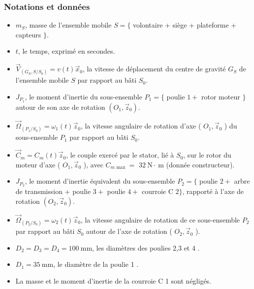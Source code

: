 \subsubsection*{Notations et données}
\begin{itemize}
  \item $m_{S}$, masse de l'ensemble mobile $S=\{$ volontaire + siège + plateforme + capteurs $\}$.
  \item $t$, le temps, exprimé en secondes.
  \item $\vec{V}_{\left(G_{S}, S / S_{0}\right)}=v(t) \vec{x}_{0}$, la vitesse de déplacement du centre de gravité $G_{S}$ de l'ensemble mobile $S$ par rapport au bâti $S_{0}$.
  \item $J_{P_{1}}$, le moment d'inertie du sous-ensemble $P_{1}=\{$ poulie $1+$ rotor moteur $\}$ autour de son axe de rotation $\left(O_{1}, \vec{z}_{0}\right)$.
  \item $\vec{\Omega}_{\left(P_{1} / S_{0}\right)}=\omega_{1}(t) \vec{z}_{0}$, la vitesse angulaire de rotation d'axe ( $O_{1}, \vec{z}_{0}$ ) du sous-ensemble $P_{1}$ par rapport au bâti $S_{0}$.
  \item $\vec{C}_{m}=C_{m}(t) \vec{z}_{0}$, le couple exercé par le stator, lié à $S_{0}$, sur le rotor du moteur d'axe ( $O_{1}, \vec{z}_{0}$ ), avec $C_{m \text { max }}=$ $32 \mathrm{~N} \cdot \mathrm{~m}$ (donnée constructeur).
  \item $J_{P_{2}}$, le moment d'inertie équivalent du sous-ensemble $P_{2}=\{$ poulie $2+$ arbre de transmission + poulie $3+$ poulie $4+$ courroie C 2$\}$, rapporté à l'axe de rotation $\left(O_{2}, \vec{z}_{0}\right)$.
  \item $\vec{\Omega}_{\left(P_{2} / S_{0}\right)}=\omega_{2}(t) \vec{z}_{0}$, la vitesse angulaire de rotation de ce sous-ensemble $P_{2}$ par rapport au bâti $S_{0}$ autour de l'axe de rotation ( $O_{2}, \vec{z}_{0}$ ).
  \item $D_{2}=D_{3}=D_{4}=100 \mathrm{~mm}$, les diamètres des poulies 2,3 et 4 .
  \item $D_{1}=35 \mathrm{~mm}$, le diamètre de la poulie 1 .
  \item La masse et le moment d'inertie de la courroie C 1 sont négligés.
\end{itemize}



